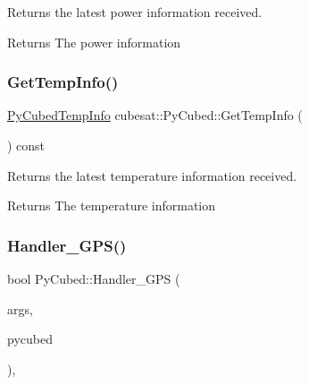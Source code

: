 Returns the latest power information received. 

\begin{DoxyReturn}{Returns}
The power information 
\end{DoxyReturn}
\mbox{\label{classcubesat_1_1PyCubed_a1eb8a72d0782680b320a336a301927a4}} 
\subsubsection{\texorpdfstring{Get\+Temp\+Info()}{GetTempInfo()}}
{\footnotesize\ttfamily \hyperlink{structcubesat_1_1PyCubedTempInfo}{Py\+Cubed\+Temp\+Info} cubesat\+::\+Py\+Cubed\+::\+Get\+Temp\+Info (\begin{DoxyParamCaption}{ }\end{DoxyParamCaption}) const\hspace{0.3cm}{\ttfamily [inline]}}



Returns the latest temperature information received. 

\begin{DoxyReturn}{Returns}
The temperature information 
\end{DoxyReturn}
\mbox{\label{classcubesat_1_1PyCubed_a60c99d1ef8b6a6b4e5721f18348b60dd}} 
\subsubsection{\texorpdfstring{Handler\+\_\+\+G\+P\+S()}{Handler\_GPS()}}
{\footnotesize\ttfamily bool Py\+Cubed\+::\+Handler\+\_\+\+G\+PS (\begin{DoxyParamCaption}\item[{std\+::vector$<$ std\+::string $>$}]{args,  }\item[{\hyperlink{classcubesat_1_1PyCubed}{Py\+Cubed} \&}]{pycubed }\end{DoxyParamCaption})\hspace{0.3cm}{\ttfamily [static]}, {\ttfamily [private]}}



